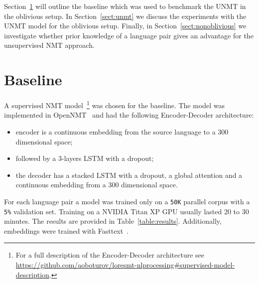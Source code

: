 \documentclass[]{article}
\begin{document}
Section~\ref{sect:baseline} will outline the baseline which was used to benchmark the \ac{UNMT} in the oblivious setup.
In Section~\ref{sect:unmt} we discuss the experiments with the \ac{UNMT} model for the oblivious setup.
Finally, in Section~\ref{sect:nonoblivious} we investigate whether prior knowledge of a language pair gives an advantage for the unsupervised \ac{NMT} approach.

\section{Baseline}
\label{sect:baseline}

A supervised \ac{NMT} model~\footnote{For a full description of the Encoder-Decoder architecture see \url{https://github.com/aoboturov/loresmt-nlprocessing\#supervised-model-description}.} was chosen for the baseline.
The model was implemented in OpenNMT~\citep{opennmt} and had the following Encoder-Decoder architecture:
\begin{itemize}
\item encoder is a continuous embedding from the source language to a $300$ dimensional space;
\item followed by a $3$-layers LSTM with a dropout;
\item the decoder has a stacked LSTM with a dropout, a global attention \citep{luong2015effective} and a continuous embedding from a $300$ dimensional space.
\end{itemize}

For each language pair a model was trained only on a {\tt 50K} parallel corpus with a {\tt 5\%} validation set.
Training on a NVIDIA Titan XP GPU usually lasted $20$ to $30$ minutes.
The results are provided in Table~\ref{table:results}.
Additionally, embeddings were trained with Fasttext~\citep{bojanowski2016enriching}.
\end{document}
